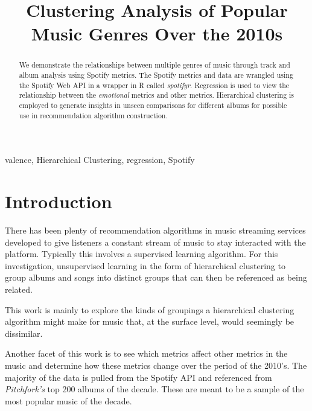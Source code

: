 \documentclass[conference]{IEEEtran}
\begin{document}
\title{Clustering Analysis of Popular Music Genres Over the 2010s}

\author{
}

\maketitle

\begin{abstract}
We demonstrate the relationships between multiple genres of music through track and album analysis using Spotify metrics. The Spotify metrics and data are wrangled using the Spotify Web API in a wrapper in R called  \textit{spotifyr}.  Regression is used to view the relationship between the \textit{emotional} metrics and other metrics. Hierarchical clustering is employed to generate insights in unseen comparisons for different albums for possible use in recommendation algorithm construction. 
\end{abstract}

\begin{IEEEkeywords}
valence, Hierarchical Clustering, regression, Spotify
\end{IEEEkeywords}

\section{Introduction}
There has been plenty of recommendation algorithms in music streaming services developed to give listeners a constant stream of music to stay interacted with the platform. Typically this involves a supervised learning algorithm. For this investigation, unsupervised learning in the form of hierarchical clustering to group albums and songs into distinct groups that can then be referenced as being related. 

This work is mainly to explore the kinds of groupings a hierarchical clustering algorithm might make for music that, at the surface level, would seemingly be dissimilar.

Another facet of this work is to see which metrics affect other metrics in the music and determine how these metrics change over the period of the 2010's. The majority of the data is pulled from the Spotify API and referenced from \textit{Pitchfork's} top 200 albums of the decade. These are meant to be a sample of the most popular music of the decade. 
\end{document}

